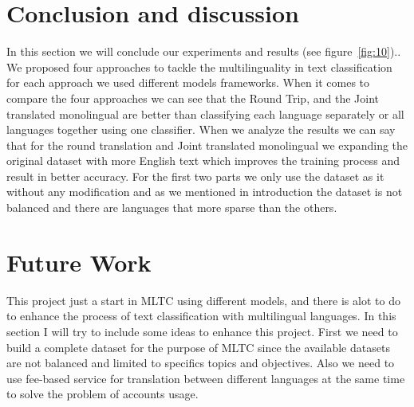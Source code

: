 \documentclass[letterpaper,12pt]{article}
\begin{document}
\section{Conclusion and discussion}
In this section we will conclude our experiments and results (see figure~\ref{fig:10}).. We proposed four approaches to tackle the multilinguality in text classification for each approach we used different models frameworks. When it comes to compare the four approaches we can see that the Round Trip, and the Joint translated monolingual are better than classifying each language separately or all languages together using one classifier. When we analyze the results we can say that for the round translation and Joint translated monolingual we expanding the original dataset with more English text which improves the training process and result in better accuracy. For the first two parts we only use the dataset as it without any modification and as we mentioned in introduction the dataset is not balanced and there are languages that more sparse than the others. 



\section{Future Work}
This project just a start in MLTC using different models, and there is alot to do to enhance the process of text classification with multilingual languages. In this section I will try to include some ideas to enhance this project. First we need to build a complete dataset for the purpose of MLTC since the available datasets are not balanced and limited to specifics topics and objectives. Also we need to use fee-based service for translation between different languages at the same time to solve the problem of accounts usage. 
\end{document}
